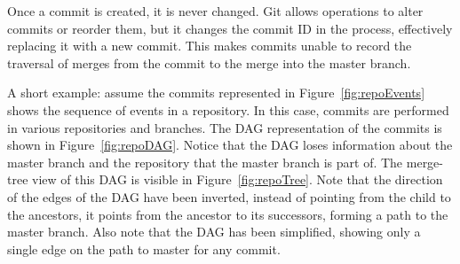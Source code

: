 \documentclass[conference, draftclsnofoot, draft]{IEEEtran}
\begin{document}
Once a commit is created, it is never changed. Git allows operations to alter
commits or reorder them, but it changes the commit ID in the process, effectively
replacing it with a new commit. This makes commits unable to record the traversal of merges
from the commit to the merge into the master branch.

A short example: assume the commits represented in Figure~\ref{fig:repoEvents} shows
the sequence of events in a repository. In this case, commits are performed in
various repositories and branches. The DAG representation of the commits is shown in
Figure~\ref{fig:repoDAG}. Notice that the DAG loses information about the master
branch and the repository that the master branch is part of. The merge-tree view of
this DAG is visible in Figure~\ref{fig:repoTree}. Note that the direction of the
edges of the DAG have been inverted, instead of pointing from the child to the
ancestors, it points from the ancestor to its successors, forming a path to the
master branch. Also note that the DAG has been simplified, showing only a single
edge on the path to master for any commit.
\end{document}
